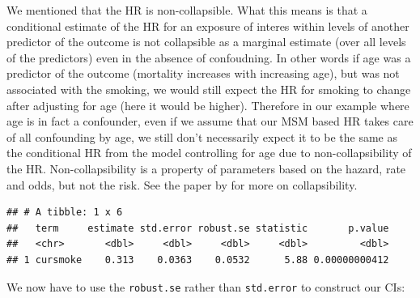 \documentclass[
]{book}
\newenvironment{Shaded}{\begin{snugshade}}{\end{snugshade}}
\newcommand{\DataTypeTok}[1]{\textcolor[rgb]{0.13,0.29,0.53}{#1}}
\newcommand{\KeywordTok}[1]{\textcolor[rgb]{0.13,0.29,0.53}{\textbf{#1}}}
\newcommand{\NormalTok}[1]{#1}
\newcommand{\OperatorTok}[1]{\textcolor[rgb]{0.81,0.36,0.00}{\textbf{#1}}}
\newcommand{\StringTok}[1]{\textcolor[rgb]{0.31,0.60,0.02}{#1}}
\begin{document}
We mentioned that the HR is non-collapsible. What this means is that a conditional estimate of the HR for an exposure of interes within levels of another predictor of the outcome is not collapsible as a marginal estimate (over all levels of the predictors) even in the absence of confoudning. In other words if age was a predictor of the outcome (mortality increases with increasing age), but was not associated with the smoking, we would still expect the HR for smoking to change after adjusting for age (here it would be higher). Therefore in our example where age is in fact a confounder, even if we assume that our MSM based HR takes care of all confounding by age, we still don't necessarily expect it to be the same as the conditional HR from the model controlling for age due to non-collapsibility of the HR. Non-collapsibility is a property of parameters based on the hazard, rate and odds, but not the risk. See the paper by \citep{greenland1999confounding} for more on collapsibility.

\begin{Shaded}
\end{Shaded}

\begin{verbatim}
## # A tibble: 1 x 6
##   term     estimate std.error robust.se statistic       p.value
##   <chr>       <dbl>     <dbl>     <dbl>     <dbl>         <dbl>
## 1 cursmoke    0.313    0.0363    0.0532      5.88 0.00000000412
\end{verbatim}

We now have to use the \texttt{robust.se} rather than \texttt{std.error} to construct our CIs:
\end{document}

